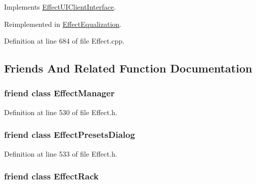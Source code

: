 Implements \hyperlink{class_effect_u_i_client_interface_acb9e8d7c50e97548e9f6235621bbe2bd}{Effect\+U\+I\+Client\+Interface}.



Reimplemented in \hyperlink{class_effect_equalization_a1defcf863397160bb35f244c8e1fdfaa}{Effect\+Equalization}.



Definition at line 684 of file Effect.\+cpp.



\subsection{Friends And Related Function Documentation}
\subsubsection[{\texorpdfstring{Effect\+Manager}{EffectManager}}]{\setlength{\rightskip}{0pt plus 5cm}friend class {\bf Effect\+Manager}\hspace{0.3cm}{\ttfamily [friend]}}\hypertarget{class_effect_aa57a70c5d4b8abc800f69a1681448634}{}\label{class_effect_aa57a70c5d4b8abc800f69a1681448634}


Definition at line 530 of file Effect.\+h.

\subsubsection[{\texorpdfstring{Effect\+Presets\+Dialog}{EffectPresetsDialog}}]{\setlength{\rightskip}{0pt plus 5cm}friend class {\bf Effect\+Presets\+Dialog}\hspace{0.3cm}{\ttfamily [friend]}}\hypertarget{class_effect_a8f8552d902153193694963dd029f4453}{}\label{class_effect_a8f8552d902153193694963dd029f4453}


Definition at line 533 of file Effect.\+h.

\subsubsection[{\texorpdfstring{Effect\+Rack}{EffectRack}}]{\setlength{\rightskip}{0pt plus 5cm}friend class Effect\+Rack\hspace{0.3cm}{\ttfamily [friend]}}\hypertarget{class_effect_a0174c15dff658a58557dec16655a996d}{}\label{class_effect_a0174c15dff658a58557dec16655a996d}


